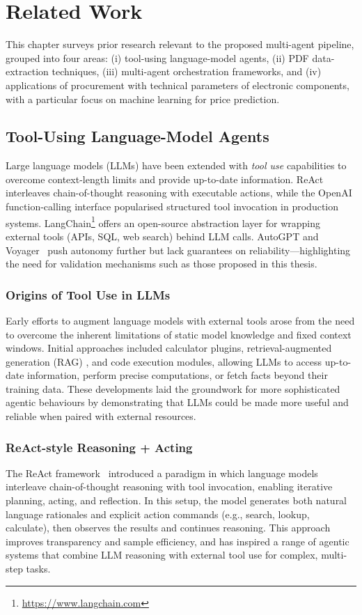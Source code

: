 \chapter{Related Work}\label{chapter:relatedwork}

This chapter surveys prior research relevant to the proposed multi-agent pipeline, grouped into four areas: (i) tool-using language-model agents, (ii) PDF data-extraction techniques, (iii) multi-agent orchestration frameworks, and (iv) applications of procurement with technical parameters of electronic components, with a particular focus on machine learning for price prediction.

\section{Tool-Using Language-Model Agents}
Large language models (LLMs) have been extended with \emph{tool use} capabilities to overcome context-length limits and provide up-to-date information.  
ReAct~\cite{yao2023react} interleaves chain-of-thought reasoning with executable actions, while the OpenAI function-calling interface popularised structured tool invocation in production systems.  
LangChain\footnote{\url{https://www.langchain.com}} offers an open-source abstraction layer for wrapping external tools (APIs, SQL, web search) behind LLM calls.  
AutoGPT and Voyager~\cite{wang2023voyager} push autonomy further but lack guarantees on reliability—highlighting the need for validation mechanisms such as those proposed in this thesis.

\subsection{Origins of Tool Use in LLMs}
Early efforts to augment language models with external tools arose from the need to overcome the inherent limitations of static model knowledge and fixed context windows. Initial approaches included calculator plugins, retrieval-augmented generation (RAG) \cite{lewis_retrieval-augmented_2021}, and code execution modules, allowing LLMs to access up-to-date information, perform precise computations, or fetch facts beyond their training data. These developments laid the groundwork for more sophisticated agentic behaviours by demonstrating that LLMs could be made more useful and reliable when paired with external resources.

\subsection{ReAct-style Reasoning + Acting}
The ReAct framework~\cite{yao2023react} introduced a paradigm in which language models interleave chain-of-thought reasoning with tool invocation, enabling iterative planning, acting, and reflection. In this setup, the model generates both natural language rationales and explicit action commands (e.g., search, lookup, calculate), then observes the results and continues reasoning. This approach improves transparency and sample efficiency, and has inspired a range of agentic systems that combine LLM reasoning with external tool use for complex, multi-step tasks.


